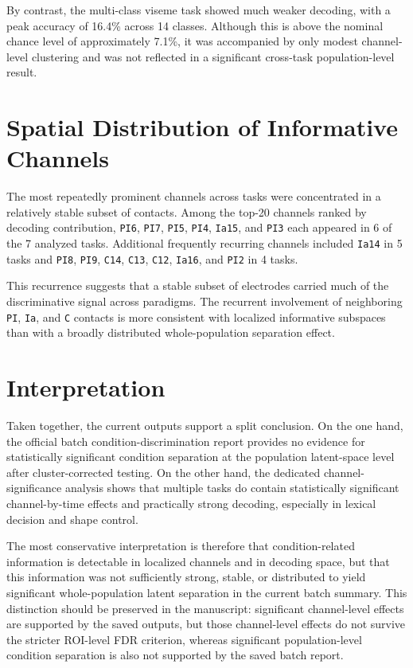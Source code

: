 By contrast, the multi-class viseme task showed much weaker decoding,
with a peak accuracy of 16.4\% across 14 classes. Although this is above
the nominal chance level of approximately 7.1\%, it was accompanied by
only modest channel-level clustering and was not reflected in a
significant cross-task population-level result.

\section{Spatial Distribution of Informative Channels}

The most repeatedly prominent channels across tasks were concentrated in
a relatively stable subset of contacts. Among the top-20 channels ranked
by decoding contribution, \texttt{PI6}, \texttt{PI7}, \texttt{PI5},
\texttt{PI4}, \texttt{Ia15}, and \texttt{PI3} each appeared in 6 of the
7 analyzed tasks. Additional frequently recurring channels included
\texttt{Ia14} in 5 tasks and \texttt{PI8}, \texttt{PI9}, \texttt{C14},
\texttt{C13}, \texttt{C12}, \texttt{Ia16}, and \texttt{PI2} in 4 tasks.

This recurrence suggests that a stable subset of electrodes carried much
of the discriminative signal across paradigms. The recurrent involvement
of neighboring \texttt{PI}, \texttt{Ia}, and \texttt{C} contacts is more
consistent with localized informative subspaces than with a broadly
distributed whole-population separation effect.

\section{Interpretation}

Taken together, the current outputs support a split conclusion. On the
one hand, the official batch condition-discrimination report provides no
evidence for statistically significant condition separation at the
population latent-space level after cluster-corrected testing. On the
other hand, the dedicated channel-significance analysis shows that
multiple tasks do contain statistically significant channel-by-time
effects and practically strong decoding, especially in lexical decision
and shape control.

The most conservative interpretation is therefore that condition-related
information is detectable in localized channels and in decoding space,
but that this information was not sufficiently strong, stable, or
distributed to yield significant whole-population latent separation in
the current batch summary. This distinction should be preserved in the
manuscript: significant channel-level effects are supported by the saved
outputs, but those channel-level effects do not survive the stricter
ROI-level FDR criterion, whereas significant population-level condition
separation is also not supported by the saved batch report.
